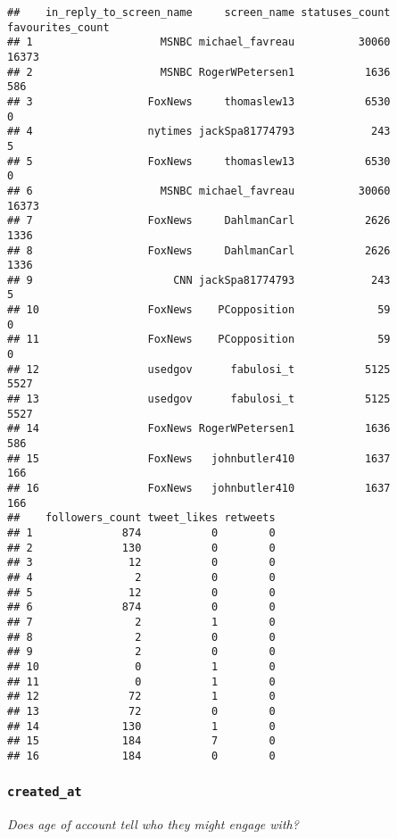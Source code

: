 \documentclass[
]{article}
\begin{document}
\begin{verbatim}
##    in_reply_to_screen_name     screen_name statuses_count favourites_count
## 1                    MSNBC michael_favreau          30060            16373
## 2                    MSNBC RogerWPetersen1           1636              586
## 3                  FoxNews     thomaslew13           6530                0
## 4                  nytimes jackSpa81774793            243                5
## 5                  FoxNews     thomaslew13           6530                0
## 6                    MSNBC michael_favreau          30060            16373
## 7                  FoxNews     DahlmanCarl           2626             1336
## 8                  FoxNews     DahlmanCarl           2626             1336
## 9                      CNN jackSpa81774793            243                5
## 10                 FoxNews    PCopposition             59                0
## 11                 FoxNews    PCopposition             59                0
## 12                 usedgov      fabulosi_t           5125             5527
## 13                 usedgov      fabulosi_t           5125             5527
## 14                 FoxNews RogerWPetersen1           1636              586
## 15                 FoxNews   johnbutler410           1637              166
## 16                 FoxNews   johnbutler410           1637              166
##    followers_count tweet_likes retweets
## 1              874           0        0
## 2              130           0        0
## 3               12           0        0
## 4                2           0        0
## 5               12           0        0
## 6              874           0        0
## 7                2           1        0
## 8                2           0        0
## 9                2           0        0
## 10               0           1        0
## 11               0           1        0
## 12              72           1        0
## 13              72           0        0
## 14             130           1        0
## 15             184           7        0
## 16             184           0        0
\end{verbatim}

\hypertarget{created_at}{%
\subsubsection{\texorpdfstring{\texttt{created\_at}}{created\_at}}\label{created_at}}

\emph{Does age of account tell who they might engage with?}
\end{document}
